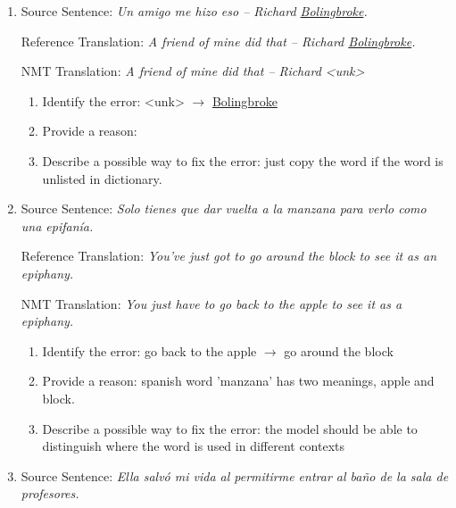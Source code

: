 \documentclass[a4paper]{article}
\begin{document}
\begin{enumerate}[label=(\alph*)]
\begin{enumerate}[label=\roman*.]
            \item
            Source Sentence: \textit{Un amigo me hizo eso – Richard \underline{Bolingbroke}.}
            
            Reference Translation: \textit{A friend of mine did that – Richard \underline{Bolingbroke}.}
            
            NMT Translation: \textit{A friend of mine did that – Richard <unk>}
            
            \begin{enumerate}[label=\arabic*.]
                \item Identify the error: <unk> $\rightarrow$ \underline{Bolingbroke} 
                \item Provide a reason: 
                \item Describe a possible way to fix the error: just copy the word if the word is unlisted in dictionary.
            \end{enumerate}
            
            \item
            
            Source Sentence: \textit{Solo tienes que dar vuelta a la manzana para verlo como una epifanía.}
            
            Reference Translation: \textit{You’ve just got to go around the block to see it as an epiphany.} 
            
            NMT Translation: \textit{You just have to go back to the apple to see it as a epiphany.}
            
            \begin{enumerate}[label=\arabic*.]
                \item Identify the error: go back to the apple $\rightarrow$ go around the block
                \item Provide a reason: spanish word 'manzana' has two meanings, apple and block.
                \item Describe a possible way to fix the error: the model should be able to distinguish where the word is used in different contexts 
            \end{enumerate} 
            
            \item
            
            Source Sentence: \textit{Ella salvó mi vida al permitirme entrar al baño de la sala de profesores.}
            

\end{enumerate}
\end{enumerate}
\end{document}
